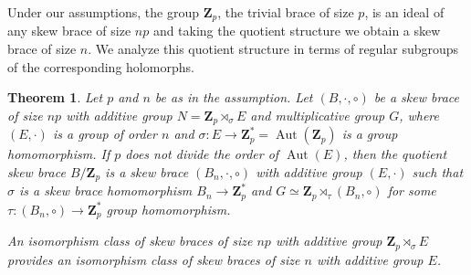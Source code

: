 \documentclass[12pt]{article}
\newtheorem{theorem}{Theorem}[section]
\theoremstyle{definition}
\newcommand{\Z}{\mathbf Z}
\newcommand{\Aut}{\operatorname{Aut}}
\begin{document}
Under our assumptions, the group $\Z_p$, the trivial brace of size $p$, is an ideal of any skew brace of size $np$ and taking the quotient structure we obtain a skew brace of size $n$. We analyze this quotient structure in terms of regular subgroups of the corresponding holomorphs.
 
	\begin{theorem}\label{npgivesn} Let $p$ and $n$ be as in the assumption. Let $(B,\cdot,\circ)$ be a skew brace of size $np$ with additive group $N=\Z_p\rtimes_{\sigma} E$ and multiplicative group $G$, where $(E,\cdot)$ is a group of order $n$ and $\sigma: E\to \Z_p^*=\Aut(\Z_p)$ is a group homomorphism. If $p$ does not divide the order of $\Aut(E)$, then 
		the quotient skew brace $B/\Z_p$ is a skew brace $(B_n, \cdot,\circ)$ with additive group $(E,\cdot)$ such that $\sigma$ is a skew brace homomorphism $B_n\to \Z_p^*$ and $G\simeq \Z_p\rtimes_{\tau} (B_n,\circ)$ for some $\tau: (B_n,\circ)\to \Z_p^*$ group homomorphism. 
		
		An isomorphism class of skew braces of size $np$ with additive group $\Z_p\rtimes_{\sigma} E$ provides an isomorphism class of skew braces of size $n$ with additive group $E$.
	\end{theorem}
	
\end{document}
